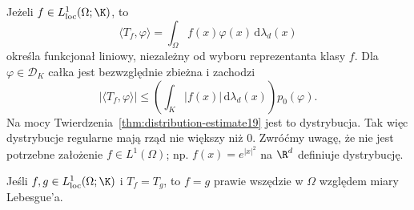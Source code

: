 \begin{przyklad}
\label{ex:regular19}
Jeżeli $f\in L^1_{\mathrm{loc}}(\Omega;\K)$, to
\[\langle T_f,\varphi\rangle=\int_\Omega
f(x)\varphi(x)\,\mathrm d\lambda_d(x)\]
określa funkcjonał liniowy, niezależny od wyboru reprezentanta
klasy $f$. Dla $\varphi\in\mathcal D_K$ całka jest bezwzględnie
zbieżna i zachodzi
\[|\langle T_f,\varphi\rangle|\le
\left(\int_K|f(x)|\,\mathrm d\lambda_d(x)\right)p_0(\varphi).\]
Na mocy Twierdzenia~\ref{thm:distribution-estimate19}
jest to dystrybucja. Tak więc dystrybucje regularne
mają rząd nie większy niż $0$.
Zwróćmy uwagę, że nie jest potrzebne założenie
$f\in L^1(\Omega)$; np. $f(x)=e^{|x|^2}$ na $\R^d$
definiuje dystrybucję.
\end{przyklad}

\begin{stwierdzenie}
\label{prop:regular-injective19}
Jeśli $f,g\in L^1_{\mathrm{loc}}(\Omega;\K)$ i $T_f=T_g$,
to $f=g$ prawie wszędzie w $\Omega$ względem miary Lebesgue'a.
\end{stwierdzenie}
